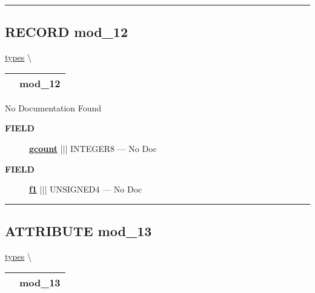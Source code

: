 \rule{\linewidth}{0.5pt}
\subsection*{\textsf{\colorbox{headtoc}{\color{white} RECORD}
mod\_12}}

\hypertarget{ecldoc:types.mod_12}{}
\hspace{0pt} \hyperlink{ecldoc:types}{types} \textbackslash 

{\renewcommand{\arraystretch}{1.5}
\begin{tabularx}{\textwidth}{|>{\raggedright\arraybackslash}l|X|}
\hline
\hspace{0pt}\mytexttt{\color{red} } & \textbf{mod\_12} \\
\hline
\end{tabularx}
}

\par





No Documentation Found







\par
\begin{description}
\item [\colorbox{tagtype}{\color{white} \textbf{\textsf{FIELD}}}] \textbf{\underline{gcount}} ||| INTEGER8 --- No Doc
\item [\colorbox{tagtype}{\color{white} \textbf{\textsf{FIELD}}}] \textbf{\underline{f1}} ||| UNSIGNED4 --- No Doc
\end{description}





\rule{\linewidth}{0.5pt}
\subsection*{\textsf{\colorbox{headtoc}{\color{white} ATTRIBUTE}
mod\_13}}

\hypertarget{ecldoc:types.mod_13}{}
\hspace{0pt} \hyperlink{ecldoc:types}{types} \textbackslash 

{\renewcommand{\arraystretch}{1.5}
\begin{tabularx}{\textwidth}{|>{\raggedright\arraybackslash}l|X|}
\hline
\hspace{0pt}\mytexttt{\color{red} } & \textbf{mod\_13} \\
\hline
\end{tabularx}
}

